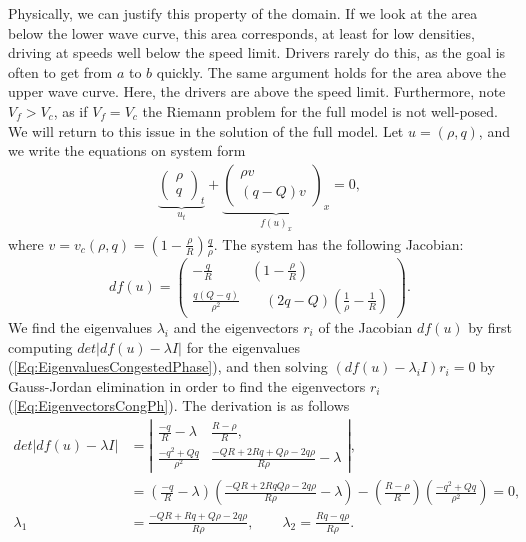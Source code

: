 \documentclass[10pt]{article}
\numberwithin{equation}{section}
\begin{document}
Physically, we can justify this property of the domain. If we look at the area below the lower wave curve, this area corresponds, at least for low densities, driving at speeds well below the speed limit. Drivers rarely do this, as the goal is often to get from $a$ to $b$ quickly. The same argument holds for the area above the upper wave curve. Here, the drivers are above the speed limit.  Furthermore, note $V_f > V_c$, as if $V_f = V_c$ the Riemann problem for the full model is not well-posed. We will return to this issue in the solution of the full model. Let $ u = (\rho, q)$, and we write the equations on system form
\begin{align*}
    \underbrace{\begin{pmatrix} \rho \\ q \end{pmatrix}_t}_{u_t} +  \underbrace{\begin{pmatrix} \rho v  \\ (q - Q) v \end{pmatrix}_x}_{f(u)_x} = 0, 
\end{align*}
where $v = v_c(\rho,  q) = (1 - \frac{\rho}{R}) \frac{q}{\rho}$. The system has the following Jacobian:
\begin{equation*}
    df(u) =\begin{pmatrix} -\frac{q}{R} & (1- \frac{\rho}{R}) \\ 
                            \frac{q(Q-q)}{\rho ^2} & \quad (2q -Q)(\frac{1}{\rho} - \frac{1}{R}) \end{pmatrix}.
\end{equation*}
We find the eigenvalues $\lambda_i$ and the eigenvectors $r_i$ of the Jacobian $df(u)$ by first computing $ det| df(u) - \lambda I| $ for the eigenvalues (\ref{Eq:EigenvaluesCongestedPhase}), and then solving $(df(u) - \lambda_i I) r_i  = 0$ by Gauss-Jordan elimination in order to find the eigenvectors $r_i$ (\ref{Eq:EigenvectorsCongPh}). The derivation is as follows 
\begin{align*}
   det| df(u) - \lambda I | &= \left|\begin{matrix}
\frac{-q}{R}-\lambda & \frac{R-\rho}{R}, \\
\frac{-q^2+Qq}{\rho^2} & \frac{-QR+2Rq+Q\rho-2q\rho}{R\rho}-\lambda
\end{matrix}\right|, \\
&= (\frac{-q}{R}-\lambda)( \frac{-QR+2RqQ\rho-2q\rho}{R\rho}-\lambda) - (\frac{R-\rho}{R})(\frac{-q^2+Qq}{\rho^2}) = 0, \\
 \lambda_1 &= \frac{-QR + Rq + Q\rho -2q\rho}{R\rho}, \quad \quad  \lambda_2 = \frac{Rq - q\rho}{R\rho} .
\end{align*}
\end{document}
